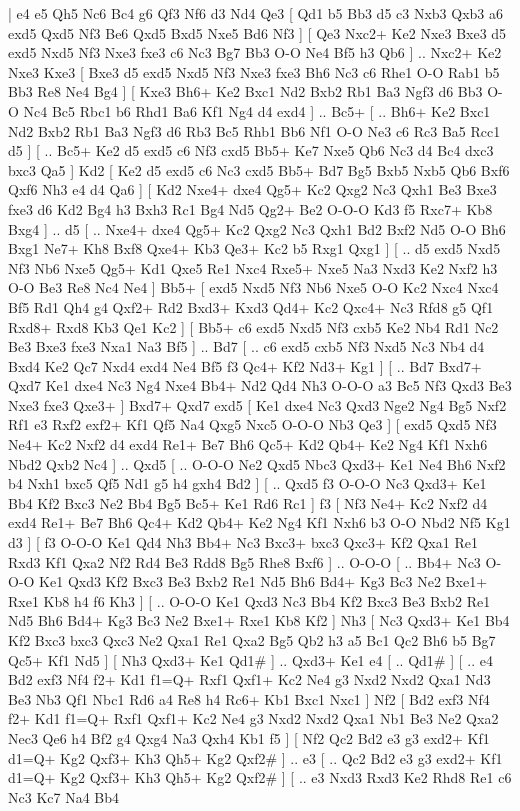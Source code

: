 \makegametitle 
|   e4   e5    Qh5   Nc6    Bc4   g6    Qf3   Nf6    d3   Nd4    Qe3 [  Qd1 b5  Bb3 d5  c3 Nxb3  Qxb3 a6  exd5 Qxd5  Nf3 Be6  Qxd5 Bxd5  Nxe5 Bd6  Nf3   ]  [  Qe3 Nxc2+  Ke2 Nxe3  Bxe3 d5  exd5 Nxd5  Nf3 Nxe3  fxe3 c6  Nc3 Bg7  Bb3 O-O  Ne4 Bf5  h3 Qb6   ] .. Nxc2+    Ke2   Nxe3    Kxe3 [  Bxe3 d5  exd5 Nxd5  Nf3 Nxe3  fxe3 Bh6  Nc3 c6  Rhe1 O-O  Rab1 b5  Bb3 Re8  Ne4 Bg4   ]  [  Kxe3 Bh6+  Ke2 Bxc1  Nd2 Bxb2  Rb1 Ba3  Ngf3 d6  Bb3 O-O  Nc4 Bc5  Rbc1 b6  Rhd1 Ba6  Kf1 Ng4  d4 exd4   ] .. Bc5+ [ .. Bh6+  Ke2 Bxc1  Nd2 Bxb2  Rb1 Ba3  Ngf3 d6  Rb3 Bc5  Rhb1 Bb6  Nf1 O-O  Ne3 c6  Rc3 Ba5  Rcc1 d5   ]  [ .. Bc5+  Ke2 d5  exd5 c6  Nf3 cxd5  Bb5+ Ke7  Nxe5 Qb6  Nc3 d4  Bc4 dxc3  bxc3 Qa5   ]  Kd2 [  Ke2 d5  exd5 c6  Nc3 cxd5  Bb5+ Bd7  Bg5 Bxb5  Nxb5 Qb6  Bxf6 Qxf6  Nh3 e4  d4 Qa6   ]  [  Kd2 Nxe4+  dxe4 Qg5+  Kc2 Qxg2  Nc3 Qxh1  Be3 Bxe3  fxe3 d6  Kd2 Bg4  h3 Bxh3  Rc1 Bg4  Nd5 Qg2+  Be2 O-O-O  Kd3 f5  Rxc7+ Kb8  Bxg4   ] .. d5 [ .. Nxe4+  dxe4 Qg5+  Kc2 Qxg2  Nc3 Qxh1  Bd2 Bxf2  Nd5 O-O  Bh6 Bxg1  Ne7+ Kh8  Bxf8 Qxe4+  Kb3 Qe3+  Kc2 b5  Rxg1 Qxg1   ]  [ .. d5  exd5 Nxd5  Nf3 Nb6  Nxe5 Qg5+  Kd1 Qxe5  Re1 Nxc4  Rxe5+ Nxe5  Na3 Nxd3  Ke2 Nxf2  h3 O-O  Be3 Re8  Nc4 Ne4   ]  Bb5+ [  exd5 Nxd5  Nf3 Nb6  Nxe5 O-O  Kc2 Nxc4  Nxc4 Bf5  Rd1 Qh4  g4 Qxf2+  Rd2 Bxd3+  Kxd3 Qd4+  Kc2 Qxc4+  Nc3 Rfd8  g5 Qf1  Rxd8+ Rxd8  Kb3 Qe1  Kc2   ]  [  Bb5+ c6  exd5 Nxd5  Nf3 cxb5  Ke2 Nb4  Rd1 Nc2  Be3 Bxe3  fxe3 Nxa1  Na3 Bf5   ] .. Bd7 [ .. c6  exd5 cxb5  Nf3 Nxd5  Nc3 Nb4  d4 Bxd4  Ke2 Qc7  Nxd4 exd4  Ne4 Bf5  f3 Qc4+  Kf2 Nd3+  Kg1   ]  [ .. Bd7  Bxd7+ Qxd7  Ke1 dxe4  Nc3 Ng4  Nxe4 Bb4+  Nd2 Qd4  Nh3 O-O-O  a3 Bc5  Nf3 Qxd3  Be3 Nxe3  fxe3 Qxe3+   ]  Bxd7+   Qxd7    exd5 [  Ke1 dxe4  Nc3 Qxd3  Nge2 Ng4  Bg5 Nxf2  Rf1 e3  Rxf2 exf2+  Kf1 Qf5  Na4 Qxg5  Nxc5 O-O-O  Nb3 Qe3   ]  [  exd5 Qxd5  Nf3 Ne4+  Kc2 Nxf2  d4 exd4  Re1+ Be7  Bh6 Qc5+  Kd2 Qb4+  Ke2 Ng4  Kf1 Nxh6  Nbd2 Qxb2  Nc4   ] .. Qxd5 [ .. O-O-O  Ne2 Qxd5  Nbc3 Qxd3+  Ke1 Ne4  Bh6 Nxf2  b4 Nxh1  bxc5 Qf5  Nd1 g5  h4 gxh4  Bd2   ]  [ .. Qxd5  f3 O-O-O  Nc3 Qxd3+  Ke1 Bb4  Kf2 Bxc3  Ne2 Bb4  Bg5 Bc5+  Ke1 Rd6  Rc1   ]  f3 [  Nf3 Ne4+  Kc2 Nxf2  d4 exd4  Re1+ Be7  Bh6 Qc4+  Kd2 Qb4+  Ke2 Ng4  Kf1 Nxh6  b3 O-O  Nbd2 Nf5  Kg1 d3   ]  [  f3 O-O-O  Ke1 Qd4  Nh3 Bb4+  Nc3 Bxc3+  bxc3 Qxc3+  Kf2 Qxa1  Re1 Rxd3  Kf1 Qxa2  Nf2 Rd4  Be3 Rdd8  Bg5 Rhe8  Bxf6   ] .. O-O-O [ .. Bb4+  Nc3 O-O-O  Ke1 Qxd3  Kf2 Bxc3  Be3 Bxb2  Re1 Nd5  Bh6 Bd4+  Kg3 Bc3  Ne2 Bxe1+  Rxe1 Kb8  h4 f6  Kh3   ]  [ .. O-O-O  Ke1 Qxd3  Nc3 Bb4  Kf2 Bxc3  Be3 Bxb2  Re1 Nd5  Bh6 Bd4+  Kg3 Bc3  Ne2 Bxe1+  Rxe1 Kb8  Kf2   ]  Nh3 [  Nc3 Qxd3+  Ke1 Bb4  Kf2 Bxc3  bxc3 Qxc3  Ne2 Qxa1  Re1 Qxa2  Bg5 Qb2  h3 a5  Bc1 Qc2  Bh6 b5  Bg7 Qc5+  Kf1 Nd5   ]  [  Nh3 Qxd3+  Ke1 Qd1#   ] .. Qxd3+    Ke1  e4 [ .. Qd1#   ]  [ .. e4  Bd2 exf3  Nf4 f2+  Kd1 f1=Q+  Rxf1 Qxf1+  Kc2 Ne4  g3 Nxd2  Nxd2 Qxa1  Nd3 Be3  Nb3 Qf1  Nbc1 Rd6  a4 Re8  h4 Rc6+  Kb1 Bxc1  Nxc1   ]  Nf2 [  Bd2 exf3  Nf4 f2+  Kd1 f1=Q+  Rxf1 Qxf1+  Kc2 Ne4  g3 Nxd2  Nxd2 Qxa1  Nb1 Be3  Ne2 Qxa2  Nec3 Qe6  h4 Bf2  g4 Qxg4  Na3 Qxh4  Kb1 f5   ]  [  Nf2 Qc2  Bd2 e3  g3 exd2+  Kf1 d1=Q+  Kg2 Qxf3+  Kh3 Qh5+  Kg2 Qxf2#   ] .. e3 [ .. Qc2  Bd2 e3  g3 exd2+  Kf1 d1=Q+  Kg2 Qxf3+  Kh3 Qh5+  Kg2 Qxf2#   ]  [ .. e3  Nxd3 Rxd3  Ke2 Rhd8  Re1 c6  Nc3 Kc7  Na4 Bb4 
